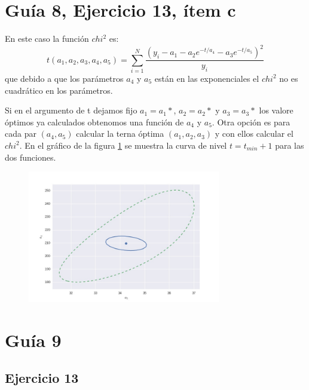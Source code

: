 \section*{Guía 8, Ejercicio 13, ítem c}
En este caso la función $chi^2$ es:
$$
t(a_1, a_2, a_3, a_4, a_5) = \sum_{i=1}^N \frac{\left(y_i-a_1 - a_2 e^{-t/a_4} - a_3 e^{-t/a_5}\right)^2}{y_i}
$$
que debido a que los parámetros $a_4$ y $a_5$ están en las exponenciales el $chi^2$ no es cuadrático en los parámetros.

Si en el argumento de t dejamos fijo $a_1=a_1*$, $a_2=a_2*$ y $a_3=a_3*$ los valore óptimos ya calculados obtenomos una función de $a_4$ y $a_5$.
 Otra opción es para cada par $(a_4, a_5)$ calcular la terna óptima $(a_1, a_2, a_3)$ y con ellos calcular el $chi^2$.
 En el gráfico de la figura \ref{fig:fig1} se muestra la curva de nivel $t=t_{min} + 1$ para las dos funciones.

\begin{figure}
\centering
\includegraphics[width=0.75\textwidth]{fig1.jpg}
\caption[]{}
\label{fig:fig1}
\end{figure}


\section*{Guía 9}
\subsection*{Ejercicio 13}
